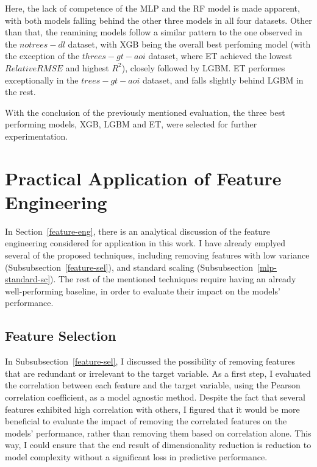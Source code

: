 Here, the lack of competence of the MLP and the RF model is made apparent, with both models falling behind the other three models in all four datasets. Other than that, the reamining models follow a similar pattern to the one observed in the $notrees-dl$ dataset, with XGB being the overall best perfoming model (with the exception of the $threes-gt-aoi$ dataset, where ET achieved the lowest $RelativeRMSE$ and highest $R^2$), closely followed by LGBM. ET performes exceptionally in the $trees-gt-aoi$ dataset, and falls slightly behind LGBM in the rest. 

With the conclusion of the previously mentioned evaluation, the three best performing models, XGB, LGBM and ET, were selected for further experimentation.

\section{Practical Application of Feature Engineering}
\label{pract-feature-eng}

In Section~\ref{feature-eng}, there is an analytical discussion of the feature engineering considered for application in this work. I have already emplyed several of the proposed techniques, including removing features with low variance (Subsubsection~\ref{feature-sel}), and standard scaling (Subsubsection~\ref{mlp-standard-sc}). The rest of the mentioned techniques require having an already well-performing baseline, in order to evaluate their impact on the models' performance. 

\subsection{Feature Selection}

In Subsubsection~\ref{feature-sel}, I discussed the possibility of removing features that are redundant or irrelevant to the target variable. As a first step, I evaluated the correlation between each feature and the target variable, using the Pearson correlation coefficient, as a model agnostic method. Despite the fact that several features exhibited high correlation with others, I figured that it would be more beneficial to evaluate the impact of removing the correlated features on the models' performance, rather than removing them based on correlation alone. This way, I could ensure that the end result of dimensionality reduction is reduction to model complexity without a significant loss in predictive performance. 

